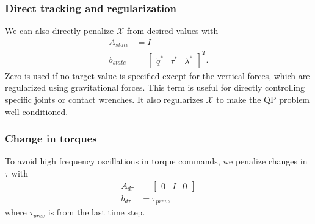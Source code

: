 \documentclass{ws-ijhr}
\newcommand{\tref}[1] {Table \ref{#1}}
\newcommand{\QPx}{\mathcal{X}}
\begin{document}
\subsubsection{Direct tracking and regularization} 
We can also directly penalize $\QPx$ from desired values with
\begin{equation}
  \begin{split}
    A_{state} &= I \\
    b_{state} &= \begin{bmatrix} \ddot{q}^* & \tau^* & \lambda^* \end{bmatrix}^T.
  \end{split}
	\label{eq:id_reg}
\end{equation}
Zero is used if no target value is specified except for the vertical forces, which 
are regularized using gravitational forces. This term is useful for directly 
controlling specific joints or contact wrenches. It also regularizes $\QPx$ to make the
QP problem well conditioned.

\subsubsection{Change in torques} 
To avoid high frequency oscillations in torque commands, we penalize changes in 
$\tau$ with
\begin{equation*}
  \begin{split}
    A_{d\tau} &= \begin{bmatrix} 0 & I & 0 \end{bmatrix} \\
    b_{d\tau} &= \tau_{prev},
  \end{split}
\end{equation*} 
where $\tau_{prev}$ is from the last time step.

\end{document}
